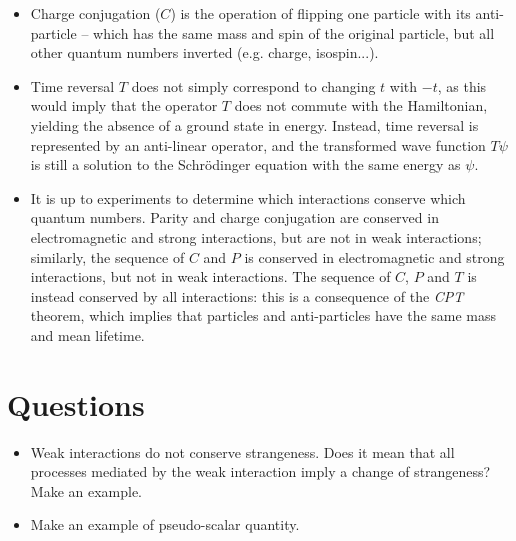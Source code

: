 \begin{itemize}
    \item Charge conjugation ($C$) is the operation of flipping one particle with its anti-particle -- which has the same mass and spin of the original particle, but all other quantum numbers inverted (e.g. charge, isospin...).
    \item Time reversal $T$ does not simply correspond to changing $t$ with $-t$, as this would imply that the operator $T$ does not commute with the Hamiltonian, yielding the absence of a ground state in energy. Instead, time reversal is represented by an anti-linear operator, and the transformed wave function $T\psi$ is still a solution to the Schr\"odinger equation with the same energy as $\psi$.
    \item It is up to experiments to determine which interactions conserve which quantum numbers. Parity and charge conjugation  are conserved in electromagnetic and strong interactions, but are not in weak interactions; similarly, the sequence of $C$ and $P$ is conserved  in  electromagnetic and strong interactions, but not in weak interactions. The sequence of $C$, $P$ and $T$ is instead conserved by all interactions: this is a consequence of the \emph{CPT} theorem, which implies that particles and anti-particles have the same mass and mean lifetime.
\end{itemize}
\section*{Questions}
\begin{itemize}
    \item Weak interactions do not conserve strangeness. Does it mean that all processes mediated by the weak interaction imply a change of strangeness? Make an example.
    \item Make an example of pseudo-scalar quantity.
\end{itemize}